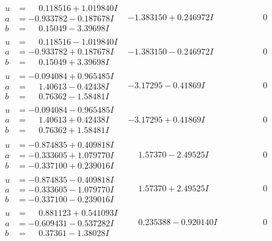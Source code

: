 \documentclass[1p]{elsarticle_modified}
\theoremstyle{definition}
\begin{document}
$$\begin{array}{c|c|c}
\begin{aligned}
u &= \phantom{-}0.118516 + 1.019840 I \\
a &= -0.933782 - 0.187678 I \\
b &= \phantom{-}0.15049 - 3.39698 I\end{aligned}
 & -1.383150 + 0.246972 I & \phantom{-0.000000 } 0 \\ \hline\begin{aligned}
u &= \phantom{-}0.118516 - 1.019840 I \\
a &= -0.933782 + 0.187678 I \\
b &= \phantom{-}0.15049 + 3.39698 I\end{aligned}
 & -1.383150 - 0.246972 I & \phantom{-0.000000 } 0 \\ \hline\begin{aligned}
u &= -0.094084 + 0.965485 I \\
a &= \phantom{-}1.40613 - 0.42438 I \\
b &= \phantom{-}0.76362 - 1.58481 I\end{aligned}
 & -3.17295 - 0.41869 I & \phantom{-0.000000 } 0 \\ \hline\begin{aligned}
u &= -0.094084 - 0.965485 I \\
a &= \phantom{-}1.40613 + 0.42438 I \\
b &= \phantom{-}0.76362 + 1.58481 I\end{aligned}
 & -3.17295 + 0.41869 I & \phantom{-0.000000 } 0 \\ \hline\begin{aligned}
u &= -0.874835 + 0.409818 I \\
a &= -0.333605 + 1.079770 I \\
b &= -0.337100 + 0.239016 I\end{aligned}
 & \phantom{-}1.57370 - 2.49525 I & \phantom{-0.000000 } 0 \\ \hline\begin{aligned}
u &= -0.874835 - 0.409818 I \\
a &= -0.333605 - 1.079770 I \\
b &= -0.337100 - 0.239016 I\end{aligned}
 & \phantom{-}1.57370 + 2.49525 I & \phantom{-0.000000 } 0 \\ \hline\begin{aligned}
u &= \phantom{-}0.881123 + 0.541093 I \\
a &= -0.609431 - 0.537282 I \\
b &= \phantom{-}0.37361 - 1.38028 I\end{aligned}
 & \phantom{-}0.235388 - 0.920140 I & \phantom{-0.000000 } 0 \\ \hline\begin{aligned}

\end{aligned}
\end{array}$$
\end{document}
